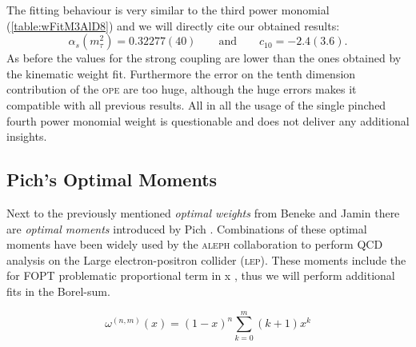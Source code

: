 \documentclass[../../index.tex]{subfiles}
\begin{document}
The fitting behaviour is very similar to the third power monomial
(\cref{table:wFitM3AlD8}) and we will directly cite our obtained results:
\begin{equation}
  \alpha_s(m_\tau^2) = 0.32277(40) \qquad \text{and} \qquad c_{10}=-2.4(3.6).
\end{equation}
As before the values for the strong coupling are lower than the ones obtained by
the kinematic weight fit. Furthermore the error on the tenth dimension
contribution of the \textsc{ope} are too huge, although the huge errors makes it
compatible with all previous results. All in all the usage of the single pinched
fourth power monomial weight is questionable and does not deliver any additional insights.

\subsection{Pich's Optimal Moments \cite{Pich2016}}
Next to the previously mentioned \textit{optimal weights} from Beneke and Jamin
\cite{Beneke2012} there are \textit{optimal moments} introduced by Pich
\cite{LeDiberder1992}. Combinations of these optimal moments have been widely
used by the \textsc{aleph} collaboration to perform QCD analysis on the Large electron-positron
collider (\textsc{lep}). These moments include the for \textsc{FOPT} problematic
proportional term in x \cite{Beneke2012}, thus we will perform additional fits
in the Borel-sum.

\begin{equation}
  \omega^{(n,m)}(x) = (1-x)^n\sum_{k=0}^m (k+1)x^k 
\end{equation}
\end{document}
